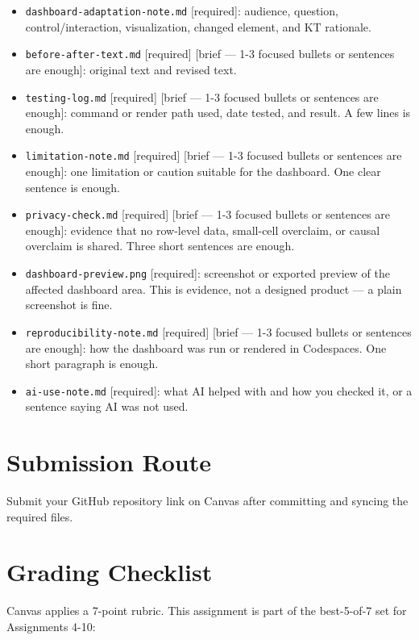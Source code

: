 \documentclass[
  letterpaper,
  DIV=11,
  numbers=noendperiod,
  oneside]{scrreprt}
\providecommand{\tightlist}{%
  \setlength{\itemsep}{0pt}\setlength{\parskip}{0pt}}
\begin{document}
\begin{itemize}
\tightlist
\item
  \texttt{dashboard-adaptation-note.md} {[}required{]}: audience,
  question, control/interaction, visualization, changed element, and KT
  rationale.
\item
  \texttt{before-after-text.md} {[}required{]} {[}brief --- 1-3 focused
  bullets or sentences are enough{]}: original text and revised text.
\item
  \texttt{testing-log.md} {[}required{]} {[}brief --- 1-3 focused
  bullets or sentences are enough{]}: command or render path used, date
  tested, and result. A few lines is enough.
\item
  \texttt{limitation-note.md} {[}required{]} {[}brief --- 1-3 focused
  bullets or sentences are enough{]}: one limitation or caution suitable
  for the dashboard. One clear sentence is enough.
\item
  \texttt{privacy-check.md} {[}required{]} {[}brief --- 1-3 focused
  bullets or sentences are enough{]}: evidence that no row-level data,
  small-cell overclaim, or causal overclaim is shared. Three short
  sentences are enough.
\item
  \texttt{dashboard-preview.png} {[}required{]}: screenshot or exported
  preview of the affected dashboard area. This is evidence, not a
  designed product --- a plain screenshot is fine.
\item
  \texttt{reproducibility-note.md} {[}required{]} {[}brief --- 1-3
  focused bullets or sentences are enough{]}: how the dashboard was run
  or rendered in Codespaces. One short paragraph is enough.
\item
  \texttt{ai-use-note.md} {[}required{]}: what AI helped with and how
  you checked it, or a sentence saying AI was not used.
\end{itemize}

\section{Submission Route}\label{submission-route-6}

Submit your GitHub repository link on Canvas after committing and
syncing the required files.

\section{Grading Checklist}\label{grading-checklist-6}

Canvas applies a 7-point rubric. This assignment is part of the
best-5-of-7 set for Assignments 4-10:
\end{document}
